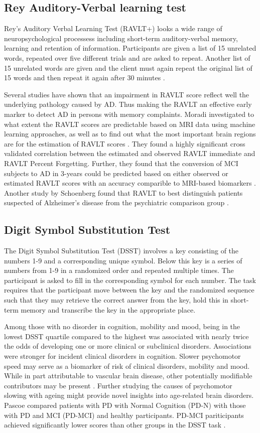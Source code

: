 \documentclass[10pt, letterpaper, twoside, openany]{book}
\begin{document}
\subsection{Rey Auditory-Verbal learning test}
Rey's Auditory Verbal Learning Test (RAVLT+) looks a wide range of neuropsychological processess including short-term auditory-verbal memory, learning and retention of information. Participants are given a list of 15 unrelated words, repeated over five different trials and are asked to repeat. Another list of 15 unrelated words are given and the client must again repeat the original list of 15 words and then repeat it again after 30 minutes \cite{Rey1941}.
\par
Several studies have shown that an impairment in RAVLT score reflect well the underlying pathology caused by AD. Thus making the RAVLT an effective early marker to detect AD in persons with memory complaints. Moradi investigated to what extent the RAVLT scores are predictable based on MRI data using machine learning approaches, as well as to find out what the most important brain regions are for the estimation of RAVLT scores \cite{Moradi2017}. They found a highly significant cross validated correlation between the estimated and observed RAVLT immediate and RAVLT Percent Forgetting. Further, they found that the conversion of MCI subjects to AD in 3-years could be predicted based on either observed or estimated RAVLT scores with an accuracy comparible to MRI-based biomarkers \cite{Moradi2017}. Another study by Schoenberg found that RAVLT to best distinguish patients suspected of Alzheimer's disease from the psychiatric comparison group \cite{Schoenberg2006}.
\subsection{Digit Symbol Substitution Test}
The Digit Symbol Substitution Test (DSST) involves a key consisting of the numbers 1-9 and a corresponding unique symbol. Below this key is a series of numbers from 1-9 in a randomized order and repeated multiple times. The participant is asked to fill in the corresponding symbol for each number. The task requires that the participant move between the key and the randomized sequence such that  they may retrieve the correct answer from the key, hold this in short-term memory and transcribe the key in the appropriate place.
\par 
Among those with no disorder in cognition, mobility and mood, being in the lowest DSST quartile compared to the highest was associated with nearly twice the odds of developing one or more clinical or subclinical disorders. Associations were stronger for incident clinical disorders in cognition. Slower psychomotor speed may serve as a biomarker of risk of clinical disorders, mobility and mood. While in part attributable to vascular brain disease, other potentially modifiable contributors may be present \cite{Rosano2016}. Further studying the causes of psychomotor slowing with ageing might provide novel insights into age-related brain disorders. Pascoe compared patients with PD with Normal Cognition (PD-N) with those with PD and MCI (PD-MCI) and healthy participants. PD-MCI pariticipants achieved significantly lower scores than other groups in the DSST task \cite{Pascoe2018}.
\end{document}
